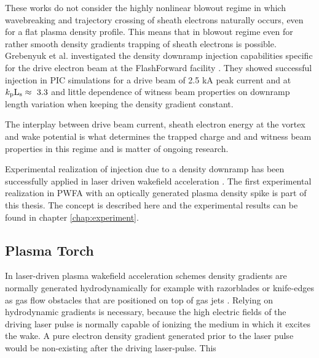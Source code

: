 These works do not consider the highly nonlinear blowout regime in which wavebreaking and trajectory crossing of sheath electrons naturally occurs, even for a flat plasma density profile.
This means that in blowout regime even for rather smooth density gradients trapping of sheath electrons is possible. Grebenyuk et al. investigated the density downramp injection capabilities specific for the drive electron beam at the FlashForward facility \cite{FlashForwardFacility2016}.
They showed successful injection in PIC simulations for a drive beam of 2.5 kA peak current and at $\kP\mathrm{L}_\mathrm{s}\approx\ 3.3$ \cite{grebenyuk2014DownRamp} and little dependence of witness beam properties on downramp length variation when keeping the density gradient constant. 

The interplay between drive beam current, sheath electron energy at the vortex and wake potential is what determines the trapped charge and and witness beam properties in this regime and is matter of ongoing research.


Experimental realization of injection due to a density downramp has been successfully applied in laser driven wakefield acceleration \cite{GeddesDensityGradientInjectionPRL2008,schmid2010densityPRSTAB2010,gonsalves2011NatureTunableDensity}
. 
The first experimental realization in PWFA with an optically generated plasma density spike is part of this thesis. The concept is described here and the experimental results can be found in  chapter \ref{chap:experiment}.

\subsection{Plasma Torch}
\label{sec:PlaTo}
In laser-driven plasma wakefield acceleration schemes density gradients are normally generated hydrodynamically for example with razorblades or knife-edges as gas flow obstacles that are positioned on top of gas jets \cite{buck2013shock,schmid2010density}. Relying on hydrodynamic gradients is necessary, because the high electric fields of the driving laser pulse is normally capable of ionizing the medium in which it excites the wake. A pure electron density gradient generated prior to the laser pulse would be non-existing after the driving laser-pulse. This 


